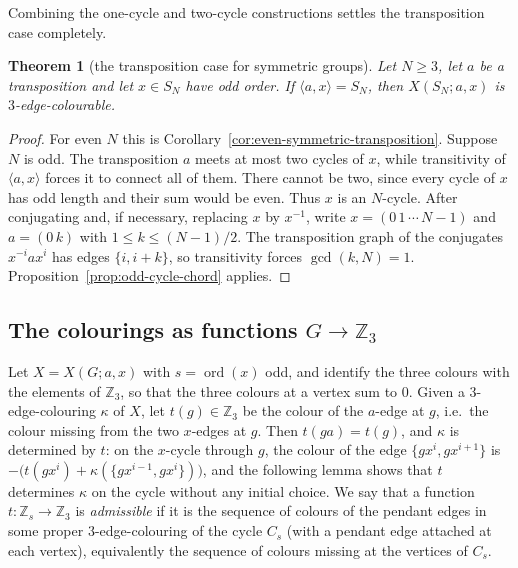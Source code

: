 \documentclass[11pt,a4paper]{article}
\newtheorem{theorem}{Theorem}[section]
\theoremstyle{definition}
\theoremstyle{remark}
\newcommand{\ord}{\operatorname{ord}}
\newcommand{\ZZ}{\mathbb{Z}}
\newcommand{\X}[3]{X(#1;#2,#3)}
\begin{document}
Combining the one-cycle and two-cycle constructions settles the transposition case completely.
\begin{theorem}[the transposition case for symmetric groups]\label{thm:symmetric-transposition}
Let $N\ge3$, let $a$ be a transposition and let $x\in S_N$ have odd order.  If $\langle a,x\rangle=S_N$, then $\X{S_N}{a}{x}$ is $3$-edge-colourable.
\end{theorem}
\begin{proof}
For even $N$ this is Corollary~\ref{cor:even-symmetric-transposition}.  Suppose $N$ is odd.  The transposition $a$ meets at most two cycles of $x$, while transitivity of $\langle a,x\rangle$ forces it to connect all of them.  There cannot be two, since every cycle of $x$ has odd length and their sum would be even.  Thus $x$ is an $N$-cycle.  After conjugating and, if necessary, replacing $x$ by $x^{-1}$, write $x=(0\,1\,\cdots\,N-1)$ and $a=(0\,k)$ with $1\le k\le(N-1)/2$.  The transposition graph of the conjugates $x^{-i}ax^i$ has edges $\{i,i+k\}$, so transitivity forces $\gcd(k,N)=1$.  Proposition~\ref{prop:odd-cycle-chord} applies.
\end{proof}

\subsection{The colourings as functions $G\to\ZZ_3$}\label{sec:Z3}
Let $X=\X{G}{a}{x}$ with $s=\ord(x)$ odd, and identify the three colours with the elements of $\ZZ_3$, so that the three colours at a vertex sum to $0$.  Given a $3$-edge-colouring $\kappa$ of $X$, let $t(g)\in\ZZ_3$ be the colour of the $a$-edge at $g$, i.e.\ the colour missing from the two $x$-edges at $g$.  Then $t(ga)=t(g)$, and $\kappa$ is determined by $t$: on the $x$-cycle through $g$, the colour of the edge $\{gx^{i},gx^{i+1}\}$ is $-\bigl(t(gx^{i})+\kappa(\{gx^{i-1},gx^i\})\bigr)$, and the following lemma shows that $t$ determines $\kappa$ on the cycle without any initial choice.  We say that a function $t\colon\ZZ_s\to\ZZ_3$ is \emph{admissible} if it is the sequence of colours of the pendant edges in some proper $3$-edge-colouring of the cycle $C_s$ (with a pendant edge attached at each vertex), equivalently the sequence of colours missing at the vertices of $C_s$.
\end{document}
